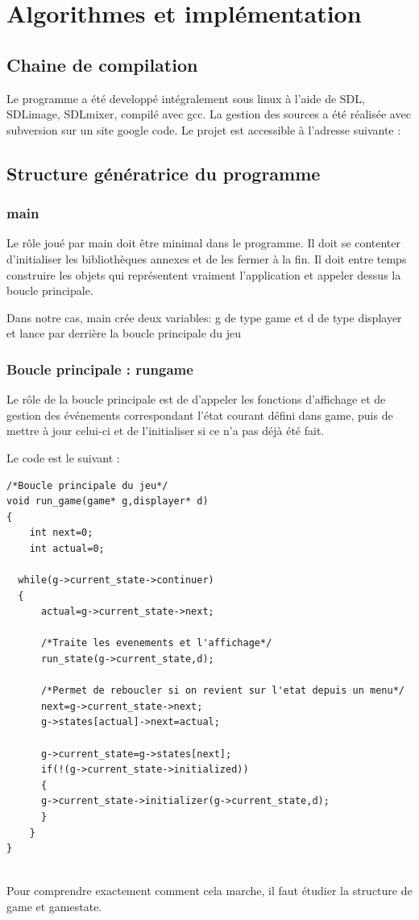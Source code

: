 \section{Algorithmes et implémentation}
\subsection{Chaine de compilation}
Le programme a été developpé intégralement sous linux à l'aide de SDL,
SDL\textunderscore image, SDL\textunderscore mixer, compilé avec
gcc. La gestion des sources a été réalisée avec subversion sur un site
google code. Le projet est accessible à l'adresse suivante : 


\subsection{Structure génératrice du programme}
\subsubsection{main}
Le rôle joué par main doit être minimal dans le programme. Il doit se
contenter d'initialiser les bibliothèques annexes et de les fermer à la
fin. Il doit entre temps construire les objets qui représentent vraiment
l'application et appeler dessus la boucle principale.
 
Dans notre cas, main crée deux variables: g de type game et d de type
displayer et lance par derrière la boucle principale du jeu

\subsubsection{Boucle principale : run\textunderscore game}
Le rôle de la boucle principale est de d'appeler les fonctions
d'affichage et de gestion des événements correspondant l'état
courant défini dans game, puis de mettre à jour celui-ci et de l'initialiser si ce n'a
pas déjà été fait.

Le code est le suivant :
\begin{lstlisting}
/*Boucle principale du jeu*/
void run_game(game* g,displayer* d)
{
    int next=0;
    int actual=0;

  while(g->current_state->continuer)
  {
      actual=g->current_state->next;

      /*Traite les evenements et l'affichage*/
      run_state(g->current_state,d);
    
      /*Permet de reboucler si on revient sur l'etat depuis un menu*/
      next=g->current_state->next;
      g->states[actual]->next=actual;

      g->current_state=g->states[next];
      if(!(g->current_state->initialized))
      {
	  g->current_state->initializer(g->current_state,d);
      }
    }
}
\end{lstlisting}
~\\
Pour comprendre exactement comment cela marche, il faut étudier la
structure de game et game\textunderscore state.
~\\
